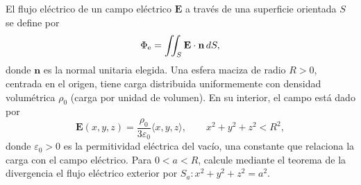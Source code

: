 ﻿El flujo eléctrico de un campo eléctrico $\mathbf E$ a través de una superficie orientada $S$ se define por
\[
\Phi_{\rm e}=\iint_S\mathbf E\cdot\mathbf n\,dS,
\]
donde $\mathbf n$ es la normal unitaria elegida. Una esfera maciza de radio $R>0$, centrada en el origen, tiene carga distribuida uniformemente con densidad volumétrica $\rho_0$ (carga por unidad de volumen). En su interior, el campo está dado por
\[
\mathbf E(x,y,z)=\frac{\rho_0}{3\varepsilon_0}\langle x,y,z\rangle,
\qquad x^2+y^2+z^2<R^2,
\]
donde $\varepsilon_0>0$ es la permitividad eléctrica del vacío, una constante que relaciona la carga con el campo eléctrico. Para $0<a<R$, calcule mediante el teorema de la divergencia el flujo eléctrico exterior por $S_a:x^2+y^2+z^2=a^2$.